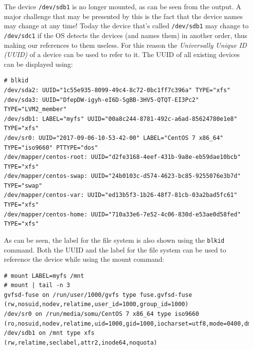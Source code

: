 \noindent
The device \verb|/dev/sdb1| is no longer mounted, as can be seen from the output. A major challenge that may be presented by this is the fact that the device names may change at any time! Today the device that's called \verb|/dev/sdb1| may change to \verb|/dev/sdc1| if the OS detects the devices (and names them) in another order, thus making our references to them useless. For this reason the \textit{Universally Unique ID (UUID)} of a device can be used to refer to it. The UUID of all existing devices can be displayed using:

\vspace{-15pt}
\begin{verbatim}
# blkid
/dev/sda2: UUID="1c55e935-8099-49c4-8c72-0bc1ff7c396a" TYPE="xfs" 
/dev/sda3: UUID="DfepDW-igyh-eI6D-SgBB-3HV5-QTQT-EI3Pc2" TYPE="LVM2_member" 
/dev/sdb1: LABEL="myfs" UUID="00a8c244-8781-492c-a6ad-85624780e1e8" TYPE="xfs" 
/dev/sr0: UUID="2017-09-06-10-53-42-00" LABEL="CentOS 7 x86_64" TYPE="iso9660" PTTYPE="dos" 
/dev/mapper/centos-root: UUID="d2fe3168-4eef-431b-9a8e-eb59dae10bcb" TYPE="xfs" 
/dev/mapper/centos-swap: UUID="24b0103c-d574-4623-bc85-9255076e3b7d" TYPE="swap" 
/dev/mapper/centos-var: UUID="ed13b5f3-1b26-48f7-81cb-03a2bad5fc61" TYPE="xfs" 
/dev/mapper/centos-home: UUID="710a33e6-7e52-4c06-830d-e53ae0d58fed" TYPE="xfs" 
\end{verbatim}
\vspace{-10pt}

\noindent
As can be seen, the label for the file system is also shown using the \verb|blkid| command. Both the UUID and the label for the file system can be used to reference the device while using the mount command:

\vspace{-15pt}
\begin{verbatim}
# mount LABEL=myfs /mnt
# mount | tail -n 3
gvfsd-fuse on /run/user/1000/gvfs type fuse.gvfsd-fuse (rw,nosuid,nodev,relatime,user_id=1000,group_id=1000)
/dev/sr0 on /run/media/somu/CentOS 7 x86_64 type iso9660 (ro,nosuid,nodev,relatime,uid=1000,gid=1000,iocharset=utf8,mode=0400,dmode=0500,uhelper=udisks2)
/dev/sdb1 on /mnt type xfs (rw,relatime,seclabel,attr2,inode64,noquota)
\end{verbatim}
\vspace{-10pt}

